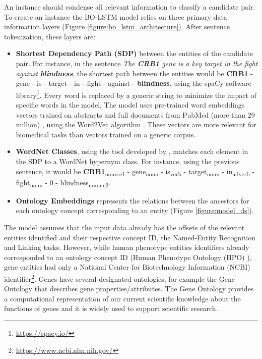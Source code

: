 An instance should condense all relevant information to classify a candidate pair. To create an instance the BO-LSTM model relies on three primary data information layers (Figure \ref{figure:bo_lstm_architecture}). After sentence tokenization, these layers are:

\begin{itemize}
   \item \textbf{Shortest Dependency Path (SDP)} between the entities of the candidate pair. For instance, in the sentence \textit{The \textbf{CRB1} gene is a key target in the fight against \textbf{blindness}}, the shortest path between the entities would be \textbf{CRB1} - gene - is - target - in - fight - against - \textbf{blindness}, using the spaCy software library\footnote{\url{https://spacy.io/}}. Every word is replaced by a generic string to minimize the impact of specific words in the model. The model uses pre-trained word embeddings vectors trained on abstracts and full documents from PubMed (more than 29 million) \citep{Pyysalo:2013b}, using the Word2Vec algorithm \citep{Mikolov:2013:DRW:2999792.2999959}. These vectors are more relevant for biomedical tasks than vectors trained on a generic corpus.
   
   \item \textbf{WordNet Classes}, using the tool developed by \cite{Ciaramita:2006:BSD:1610075.1610158}, matches each element in the SDP to a WordNet hypernym class. For instance, using the previous sentence, it would be \textbf{CRB1}\textsubscript{noun.e1} - gene\textsubscript{noun} - is\textsubscript{verb} - target\textsubscript{noun} - in\textsubscript{adverb} - fight\textsubscript{noun} - 0 - blindness\textsubscript{noun.e2}.
   
   \item \textbf{Ontology Embeddings} represents the relations between the ancestors for each ontology concept corresponding to an entity (Figure \ref{figure:model_ds}).
\end{itemize}

The model assumes that the input data already has the offsets of the relevant entities identified and their respective concept ID, the Named-Entity Recognition and Linking tasks. However, while human phenotype entities identifiers already corresponded to an ontology concept ID (Human Phenotype Ontology (HPO) \citep{HPO}), gene entities had only a National Center for Biotechnology Information (NCBI) identifier\footnote{\url{https://www.ncbi.nlm.nih.gov/}}. Genes have several designated ontologies, for example the Gene Ontology \citep{GO} that describes gene properties/attributes. The Gene Ontology provides a computational representation of our current scientific knowledge about the functions of genes and it is widely used to support scientific research.

